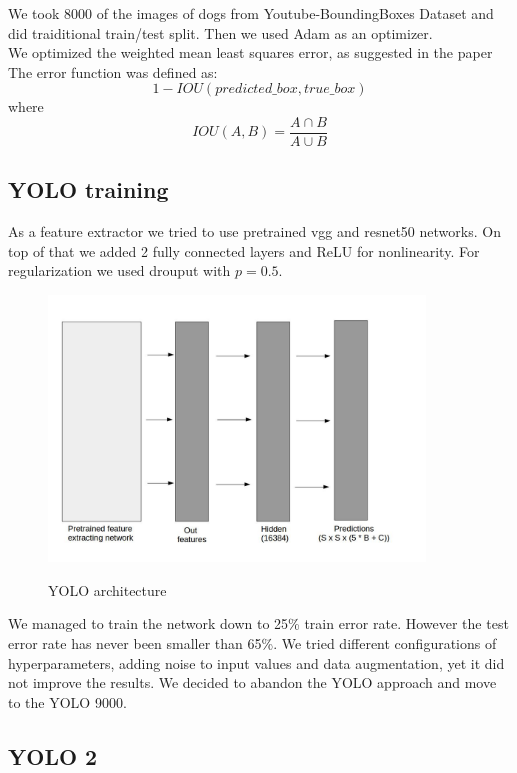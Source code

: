 \documentclass{article}
\begin{document}
We took 8000 of the images of dogs from Youtube-BoundingBoxes Dataset and did traiditional train/test split. Then we used Adam as an optimizer. \\

We optimized the weighted mean least squares error, as suggested in the paper \cite{yolo} \\

The error function was defined as:
$$ 1 - IOU(predicted\_box, true\_box)$$
where
$$ IOU(A, B) = \frac{ A \cap B}{A \cup B} $$

\subsection*{YOLO training}
As a feature extractor we tried to use pretrained vgg and resnet50 networks. On top of that we added 2 fully connected layers and ReLU for nonlinearity. For regularization we used drouput with $p = 0.5$. 

\begin{figure}[H]
	\begin{center}
		\includegraphics[width=10cm]{yolo_arch.jpg}\\
		\centering
		\caption{YOLO architecture}
	\end{center}
\hfill

\end{figure}

We managed to train the network down to 25\% train error rate. However the test error rate has never been smaller than 65\%. We tried different configurations of hyperparameters, adding noise to input values and data augmentation, yet it did not improve the results. We decided to abandon the YOLO approach and move to the YOLO 9000.

\subsection*{YOLO 2}
\end{document}
